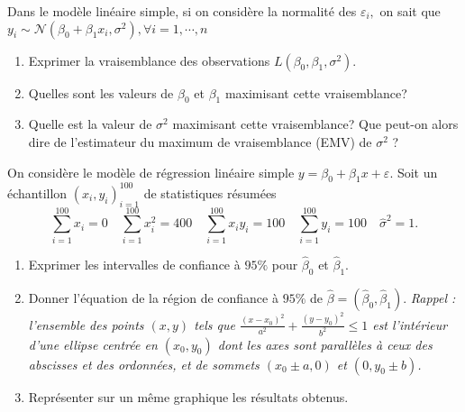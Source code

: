 \documentclass{td_um}
\providecommand{\1}{\mathds{1}}
\begin{document}
\cor{\newpage}


\exo{}
Dans le modèle linéaire simple, si on considère la normalité des $\varepsilon_{i},$ on sait que $y_{i} \sim \mathcal{N}\left(\beta_{0}+\beta_{1} x_{i}, \sigma^{2}\right), \forall i=1, \cdots, n$
\begin{enumerate}
    \item  Exprimer la vraisemblance des observations $L\left(\beta_{0}, \beta_{1}, \sigma^{2}\right)$.
    \item  Quelles sont les valeurs de $\beta_{0}$ et $\beta_{1}$ maximisant cette vraisemblance?
    \item  Quelle est la valeur de $\sigma^{2}$ maximisant cette vraisemblance? Que peut-on alors dire de l'estimateur du maximum de vraisemblance (EMV) de $\sigma^{2}$ ?
\end{enumerate}

\cor{\newpage}

 On considère le modèle de régression linéaire simple $y=\beta_{0}+\beta_{1} x+\varepsilon$. Soit un échantillon $(x_{i}, y_{i})_{i=1}^{100}$ de statistiques résumées
$$
\sum_{i=1}^{100} x_{i}=0 \quad \sum_{i=1}^{100} x_{i}^{2}=400 \quad \sum_{i=1}^{100} x_{i} y_{i}=100 \quad \sum_{i=1}^{100} y_{i}=100 \quad \hat{\sigma}^{2}=1 .
$$
\begin{enumerate}
    \item  Exprimer les intervalles de confiance à $95 \%$ pour $\hat\beta_{0}$ et $\hat\beta_{1}$.
    \item  Donner l'équation de la région de confiance à $95 \%$ de $\hat\beta = \left(\hat\beta_{0}, \hat\beta_{1}\right) .$ \textit{Rappel : l'ensemble des points $(x, y)$ tels que $\frac{\left(x-x_{0}\right)^{2}}{a^{2}}+\frac{\left(y-y_{0}\right)^{2}}{b^{2}} \leq 1$ est l'intérieur d'une ellipse centrée en $(x_{0}, y_{0})$ dont les axes sont parallèles à ceux des abscisses et des ordonnées, et de sommets $(x_{0} \pm a, 0)$ et  $(0, y_{0} \pm b)$.}
    \item  Représenter sur un même graphique les résultats obtenus.
    \end{enumerate}
\end{document}

